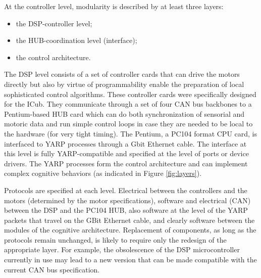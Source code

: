 At the controller level, modularity is described by at least three layers:
\begin{itemize}
	\item the DSP-controller level;
	\item the HUB-coordination level (interface);
	\item the control architecture.
\end{itemize}
The DSP level consists of a set of controller cards that can drive the motors
directly but also by virtue of programmability enable the preparation of local
sophisticated control algorithms. These controller cards were specifically 
designed for the ICub. They communicate through a set of four CAN bus backbones
to a Pentium-based HUB card which can do both synchronization of sensorial and
motoric data and run simple control loops in case they are needed to be local 
to the hardware (for very tight timing). The Pentium, a PC104 format CPU card, is 
interfaced to YARP processes through a Gbit Ethernet cable.
The interface at this level is fully YARP-compatible and specified at the level
of ports or device drivers. The YARP processes form the control architecture 
and can implement complex cognitive behaviors (as indicated in Figure \ref{fig:layers}).

Protocols are specified at each level. Electrical between the controllers and the
motors (determined by the motor specifications), software and electrical (CAN) 
between the DSP and the PC104 HUB, also software at the level of the YARP 
packets that travel on the GBit Ethernet cable, and clearly software between 
the modules of the cognitive architecture. 
Replacement of components, as long as the protocols remain unchanged, is likely
to require only the redesign of the appropriate layer. For example, the obsolescence 
of the DSP microcontroller currently in use may lead to a new version that can 
be made compatible with the current CAN bus specification. 

